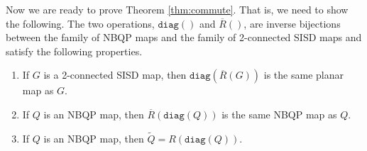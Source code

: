 \documentclass{article}
\newcommand{\diag}[0]{\mathtt{diag}}
\begin{document}
Now we are ready to prove Theorem \ref{thm:commute}. That is, we need to show the following. The two operations, $\diag()$ and $\overline R()$, are inverse bijections between the family of NBQP maps and the family of 2-connected SISD maps and satisfy the following properties.  

\begin{enumerate}
    \item[a)] If $G$ is a 2-connected SISD map, then $\diag(\overline R(G))$ is the same planar map as $G$.
    \item[b)] If $Q$ is an NBQP map, then $\overline R(\diag(Q))$ is the same NBQP map as $Q$.
    \item[c)] If $Q$ is an NBQP map, then $\widetilde Q=R(\diag(Q))$. 
\end{enumerate}
\end{document}
